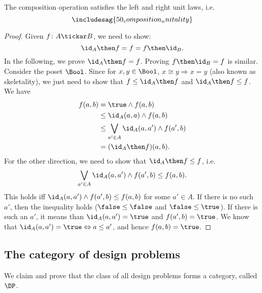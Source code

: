 \begin{lemma}
    The composition operation satisfies the left and right unit laws, i.e.
\begin{equation}
    \includesag{50_composition_unitality}
\end{equation}
\end{lemma}
\begin{proof}
Given $f\colon A\tickar B$, we need to show:
\begin{equation}
    \id_A \then f = f = f\then \id_B.
\end{equation}
In the following, we prove $\id_A \then f = f$. Proving $f\then \id_B=f$ is similar.
Consider the poset $\Bool$. Since for $x,y\in \Bool$, $x\cong y \Rightarrow x=y$ (also known as skeletality), we just need to show that $f\leq \id_A\then f$ and $\id_A\then f\leq f$.
We have
\begin{equation}
\begin{aligned}
        f(a,b)&=\true \wedge f(a,b)\\
        &\leq \id_A(a,a) \wedge f(a,b)\\
        &\leq \bigvee_{a'\in A}\id_A(a,a')\wedge f(a',b)\\
        &=(\id_A\then f)(a,b).
\end{aligned}
\end{equation}
For the other direction, we need to show that $\id_A\then f\leq f$, i.e.
\begin{equation}
    \bigvee_{a'\in A}\id_A(a,a')\wedge f(a',b) \leq f(a,b).
\end{equation}
This holds iff $\id_A(a,a')\wedge f(a',b) \leq f(a,b)$ for some $a'\in A$. If there is no such $a'$, then the inequality holds ($\false \leq \false$ and $\false \leq \true$). If there is such an $a'$, it means than $\id_A(a,a')=\true$ and $f(a',b)=\true$. We know that $\id_A(a,a')=\true \Leftrightarrow a\leq a'$, and hence $f(a,b)=\true$.
\end{proof}

\subsection{The category of design problems}

We claim and prove that the class of all design problems forms a category, called $\DP$.

